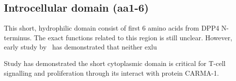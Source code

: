 \subsection{Introcellular domain (aa1-6)}

This short, hydrophilic domain consist of first 6 amino acids from DPP4 N-terminus. The exact functions related to this region is still unclear. However, early study by~\citet{Hong1990} has demonstrated that neither exlu

Study has demonstrated the short cytoplasmic domain is critical for T-cell signalling and proliferation through its interact with protein CARMA-1. \cite{Ohnuma_2007}